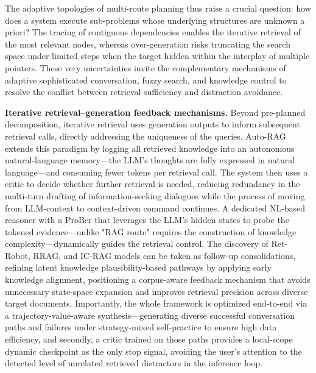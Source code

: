 \documentclass[11pt,a4paper]{article}
\begin{document}
The adaptive topologies of multi-route planning thus raise a crucial question: how does a system execute sub-problems whose underlying structures are unknown a priori? The tracing of contiguous dependencies enables the iterative retrieval of the most relevant nodes, whereas over-generation risks truncating the search space under limited steps when the target hidden within the interplay of multiple pointers. These very uncertainties invite the complementary mechanisms of adaptive sophisticated conversation, fuzzy search, and knowledge control to resolve the conflict between retrieval sufficiency and distraction avoidance.

\textbf{Iterative retrieval--generation feedback mechanisms.} Beyond pre-planned decomposition, iterative retrieval uses generation outputs to inform subsequent retrieval calls, directly addressing the uniqueness of the queries. Auto-RAG extends this paradigm by logging all retrieved knowledge into an autonomous natural-language memory---the LLM's thoughts are fully expressed in natural language---and consuming fewer tokens per retrieval call. The system then uses a critic to decide whether further retrieval is needed, reducing redundancy in the multi-turn drafting of information-seeking dialogues while the process of moving from LLM-context to context-driven command continues. A dedicated NL-based reasoner with a ProBer that leverages the LLM's hidden states to probe the tokened evidence---unlike "RAG route" requires the construction of knowledge complexity---dynamically guides the retrieval control. The discovery of Ret-Robot, RRAG, and IC-RAG models can be taken as follow-up consolidations, refining latent knowledge plausibility-based pathways by applying early knowledge alignment, positioning a corpus-aware feedback mechanism that avoids unnecessary state-space expansion and improves retrieval precision across diverse target documents. Importantly, the whole framework is optimized end-to-end via a trajectory-value-aware synthesis---generating diverse successful conversation paths and failures under strategy-mixed self-practice to ensure high data efficiency, and secondly, a critic trained on those paths provides a local-scope dynamic checkpoint as the only stop signal, avoiding the user's attention to the detected level of unrelated retrieved distractors in the inference loop.
\end{document}
